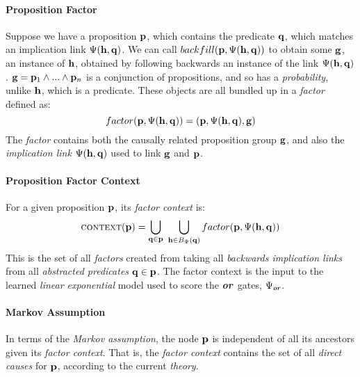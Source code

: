 \documentclass[11pt]{article}
\newcommand{\backlinks}{B_\Psi}
\newcommand{\pvariable}{{\bf p}}
\newcommand{\qvariable}{{\bf q}}
\newcommand{\gvariable}{{\bf g}}
\newcommand{\hvariable}{{\bf h}}
\newcommand{\opor}{\textbf{\em or}}
\begin{document}
\paragraph{Proposition Factor}
Suppose we have a proposition $\pvariable$, which contains the predicate $\qvariable$, which matches an implication link $\Psi(\hvariable, \qvariable)$.
We can call 
$backfill(\pvariable, \Psi(\hvariable, \qvariable))$ to obtain some $\gvariable$, an instance of $\hvariable$, obtained by following backwards an instance of the link $\Psi(\hvariable, \qvariable)$.
$\gvariable = \pvariable_1 \land ... \land \pvariable_n$ is a conjunction of propositions, and so has a {\em probability}, unlike $\hvariable$, which is a predicate. These objects are all bundled up in a {\em factor} defined as:
\begin{equation}
    factor(\pvariable, \Psi(\hvariable, \qvariable)) = (\pvariable, \Psi(\hvariable, \qvariable), \gvariable)
\end{equation}
The {\em factor} contains both the causally related proposition group $\gvariable$, and also the {\em implication link} $\Psi(\hvariable, \qvariable)$ used to link $\gvariable$ and $\pvariable$.

\paragraph{Proposition Factor Context}
For a given proposition $\pvariable$, its {\em factor context} is:
\begin{equation}
    \textsc{context}(\pvariable) =
        \bigcup_{\substack{\qvariable \in \pvariable}}\ 
            \bigcup_{\substack{\hvariable \in \backlinks (\qvariable)}}
            factor(\pvariable, \Psi(\hvariable, \qvariable))
\end{equation}
This is the set of all {\em factors} created from taking all {\em backwards implication links} from all {\em abstracted predicates} $\qvariable \in \pvariable$.
The factor context is the input to the learned {\em linear exponential} model used to score the \opor\ gates, $\Psi_\opor$.
\paragraph{Markov Assumption}
In terms of the {\em Markov assumption}, the node $\pvariable$ is independent of all its ancestors given its {\em factor context}.
That is, the {\em factor context} contains the set of all {\em direct causes} for $\pvariable$, according to the current {\em theory}.
\end{document}
